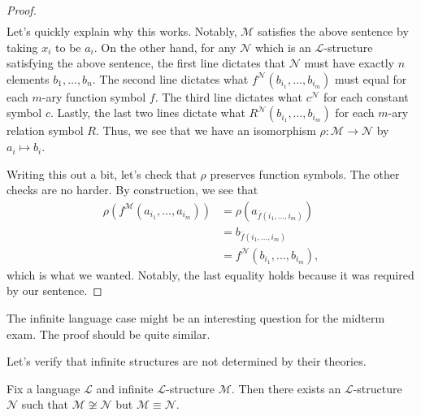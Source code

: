 \documentclass[../notes.tex]{subfiles}
\begin{document}
\begin{proof}
\begin{align*}
	\end{align*}
	Let's quickly explain why this works. Notably, $\mathcal M$ satisfies the above sentence by taking $x_i$ to be $a_i$. On the other hand, for any $\mathcal N$ which is an $\mathcal L$-structure satisfying the above sentence, the first line dictates that $\mathcal N$ must have exactly $n$ elements $b_1,\ldots,b_n$. The second line dictates what $f^\mathcal N(b_{i_1},\ldots,b_{i_m})$ must equal for each $m$-ary function symbol $f$. The third line dictates what $c^\mathcal N$ for each constant symbol $c$. Lastly, the last two lines dictate what $R^\mathcal N(b_{i_1},\ldots,b_{i_m})$ for each $m$-ary relation symbol $R$. Thus, we see that we have an isomorphism $\rho\colon\mathcal M\to\mathcal N$ by $a_i\mapsto b_i$.

	Writing this out a bit, let's check that $\rho$ preserves function symbols. The other checks are no harder. By construction, we see that
	\begin{align*}
		\rho\left(f^\mathcal M(a_{i_1},\ldots,a_{i_m})\right) &= \rho\left(a_{\overline f(i_1,\ldots,i_m)}\right) \\
		&= b_{\overline f(i_1,\ldots,i_m)} \\
		&= f^\mathcal N(b_{i_1},\ldots,b_{i_m}),
	\end{align*}
	which is what we wanted. Notably, the last equality holds because it was required by our sentence.
\end{proof}
\begin{remark}
	The infinite language case might be an interesting question for the midterm exam. The proof should be quite similar.
\end{remark}
Let's verify that infinite structures are not determined by their theories.
\begin{proposition} \label{prop:go-up-elementary-substructure}
	Fix a language $\mathcal L$ and infinite $\mathcal L$-structure $\mathcal M$. Then there exists an $\mathcal L$-structure $\mathcal N$ such that $\mathcal M\not\cong\mathcal N$ but $\mathcal M\equiv\mathcal N$.
\end{proposition}
\end{document}
